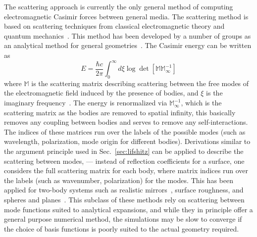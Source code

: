 The scattering approach is currently the only general method of computing 
electromagnetic Casimir forces between general media.  The scattering method 
is based on scattering techniques from classical electromagnetic theory and quantum mechanics~\cite{Rahi2009}.
This method has been developed by a number of groups as an analytical method for general geometries~\cite{Emig2004, Lambrecht2006,
Kenneth2006, Emig2007,
MaiaNeto2008,Canaguier-Durand2012,Rahi2009}.  
The Casimir energy can be written as 
\begin{equation}
  E = \frac{\hbar c}{2\pi}\int_{0}^\infty d\xi \log\det[\mathbb{M}\mathbb{M}^{-1}_{\infty}]
  \label{eq:scattering}
\end{equation}
where $\mathbb{M}$ is the scattering matrix describing scattering between the free modes of the electromagnetic
field induced by the presence of bodies, and $\xi$ is the imaginary frequency~\cite{Rahi2009}.
The energy is renormalized via $\mathbb{M}^{-1}_\infty$,
which is the scattering matrix as the bodies are removed to spatial infinity, this basically removes any
coupling between bodies and serves to remove any self-interactions. 
The indices of these matrices run over the labels of the possible modes (such as wavelength, polarization, mode origin for different bodies).
Derivations similar to the argument principle used in Sec.~\ref{sec:lifshitz} can be applied to describe the scattering between modes,
--- instead of reflection coefficients for a surface, one considers the full scattering matrix for each body,
where matrix indices run over the labels (such as wavenumber, polarization) for the modes.
This has been applied for two-body systems such as realistic mirrors~\cite{Lambrecht2006}, surface roughness, 
and spheres and planes~\cite{Canaguier-Durand2012}.   
This subclass of these methods rely on scattering between mode functions suited to analytical expansions,
 and while they in principle offer a general purpose numerical method, 
the simulations may be slow to converge if the choice of basis functions is poorly suited to the actual
geometry required.  

